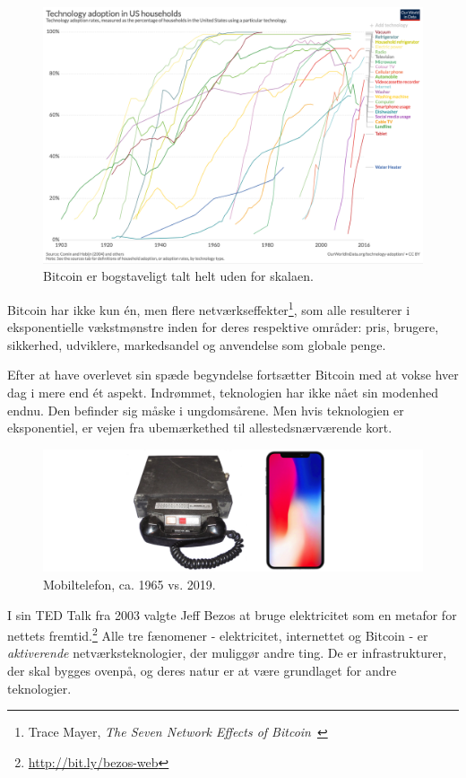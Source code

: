 \documentclass[paper=6in:9in,pagesize=pdftex,headinclude=on,footinclude=on,12pt]{scrbook}
\begin{document}
\begin{figure}
  \includegraphics{assets/images/tech-adoption.png}
  \caption{Bitcoin er bogstaveligt talt helt uden for skalaen.}
  \label{fig:tech-adoption}
\end{figure}

Bitcoin har ikke kun \'en, men flere netværkseffekter\footnote{Trace Mayer, \textit{The Seven Network Effects of Bitcoin}~\cite{7-network-effects}}, som alle resulterer i eksponentielle vækstmønstre inden for deres respektive områder: pris, brugere, sikkerhed, udviklere, markedsandel og anvendelse som globale penge.

Efter at have overlevet sin spæde begyndelse fortsætter Bitcoin med at vokse hver dag i mere end \'et aspekt. Indrømmet, teknologien har ikke nået sin modenhed endnu. Den befinder sig måske i ungdomsårene. Men hvis teknologien er eksponentiel, er vejen fra ubemærkethed til allestedsnærværende kort.\begin{figure}
  \includegraphics{assets/images/mobile-phone.png}
  \caption{Mobiltelefon, ca. 1965 vs. 2019.}
  \label{fig:mobile-phone}
\end{figure}

I sin TED Talk fra 2003 valgte Jeff Bezos at bruge elektricitet som en metafor for nettets fremtid.\footnote{\url{http://bit.ly/bezos-web}} Alle tre fænomener - elektricitet, internettet og Bitcoin - er \textit{aktiverende} netværksteknologier, der muliggør andre ting. De er infrastrukturer, der skal bygges ovenpå, og deres natur er at være grundlaget for andre teknologier.
\end{document}

